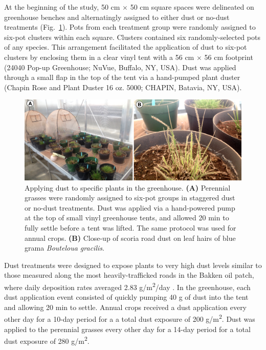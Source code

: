 \documentclass{svjour3}
\begin{document}
At the beginning of the study, 50 cm $\times$ 50 cm square spaces were delineated on greenhouse benches and alternatingly assigned to either dust or no-dust treatments (Fig.~\ref{pic:dusting}). 
Pots from each treatment group were randomly assigned to six-pot clusters within each square. 
Clusters contained six randomly-selected pots of any species. 
This arrangement facilitated the application of dust to six-pot clusters by enclosing them in a clear vinyl tent with a 56 cm $\times$ 56 cm footprint (24040 Pop-up Greenhouse; NuVue, Buffalo, NY, USA). 
Dust was applied through a small flap in the top of the tent via a hand-pumped plant duster (Chapin Rose and Plant Duster 16 oz. 5000; CHAPIN, Batavia, NY, USA). 

\begin{figure}
  \includegraphics[width=\linewidth]{GreenhouseDust}
  \caption{Applying dust to specific plants in the greenhouse. 
  \textbf{(A)} Perennial grasses were randomly assigned to six-pot groups in staggered dust or no-dust treatments. 
  Dust was applied via a hand-powered pump at the top of small vinyl greenhouse tents, and allowed 20 min to fully settle before a tent was lifted. 
  The same protocol was used for annual crops. 
  \textbf{(B)} Close-up of scoria road dust on leaf hairs of blue grama \emph{Bouteloua gracilis}. 
  \label{pic:dusting}}
\end{figure}

Dust treatments were designed to expose plants to very high dust levels similar to those measured along the most heavily-trafficked roads in the Bakken oil patch, where daily deposition rates averaged 2.83 g/m\textsuperscript{2}/day \citep{spiess2020}. 
In the greenhouse, each dust application event consisted of quickly pumping 40 g of dust into the tent and allowing 20 min to settle.
Annual crops received a dust application every other day for a 10-day period for a  a total dust exposure of 200 g/m\textsuperscript{2}.
Dust was applied to the perennial grasses every other day for a 14-day period for a total dust exposure of 280 g/m\textsuperscript{2}.
\end{document}

